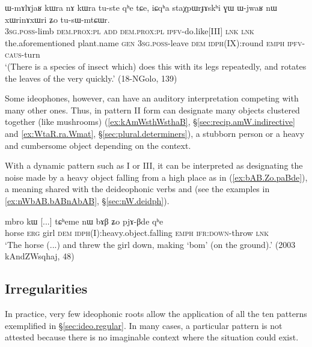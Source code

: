 \begin{exe} 
\ex  \label{ex:xWrinAxWri}
\gll ɯ-mɤlɤjaʁ kɯra nɤ kɯra tu-ste qʰe tɕe, iɕqʰa staχpɯrɟɤskʰi ɣɯ ɯ-jwaʁ nɯ xɯrinɤxɯri ʑo tu-sɯ-mtɕɯr. \\
\textsc{3sg}.\textsc{poss}-limb \textsc{dem}.\textsc{prox}:\textsc{pl} \textsc{add}  \textsc{dem}.\textsc{prox}:\textsc{pl} \textsc{ipfv}-do.like[III] \textsc{lnk} \textsc{lnk} the.aforementioned plant.name \textsc{gen} \textsc{3sg}.\textsc{poss}-leave \textsc{dem} \textsc{idph}(IX):round \textsc{emph} \textsc{ipfv}-\textsc{caus}-turn \\
\glt `(There is a species of insect which) does this with its legs repeatedly, and rotates the leaves of the  very quickly.' (18-NGolo, 139)
\end{exe} 

Some ideophones, however, can have an auditory interpretation competing with many other ones. Thus,  in pattern II form  can designate many objects clustered together (like mushrooms) (\ref{ex:kAmWsthWsthaB}, §\ref{sec:recip.amW.indirective} and \ref{ex:WtaR.ra.Wmat}, §\ref{sec:plural.determiners}), a stubborn person or a heavy and cumbersome object depending on the context. 

With a dynamic pattern such as I or III, it can be interpreted as designating the noise made by a heavy object falling from a high place as in (\ref{ex:bAB.Zo.paBde}), a meaning shared with the deideophonic verbs  and  (see the examples in  \ref{ex:nWbAB.bABnAbAB}, §\ref{sec:nW.deidph}).

\begin{exe}
\ex \label{ex:bAB.Zo.paBde}
\gll mbro kɯ [...] tɕʰeme nɯ bɤβ ʑo pjɤ-βde qʰe \\
horse \textsc{erg} { } girl \textsc{dem} \textsc{idph}(I):heavy.object.falling \textsc{emph} \textsc{ifr}:\textsc{down}-throw \textsc{lnk}  \\
\glt `The horse (...) and threw the girl down, making `bom' (on the ground).' (2003 kAndZWsqhaj, 48)
\end{exe}


\subsection{Irregularities} \label{sec:ideo.irregular}
In practice, very few ideophonic roots allow the application of all the ten patterns exemplified in §\ref{sec:ideo.regular}.  In many cases, a particular pattern is not attested because there is no imaginable context where the situation could exist.

